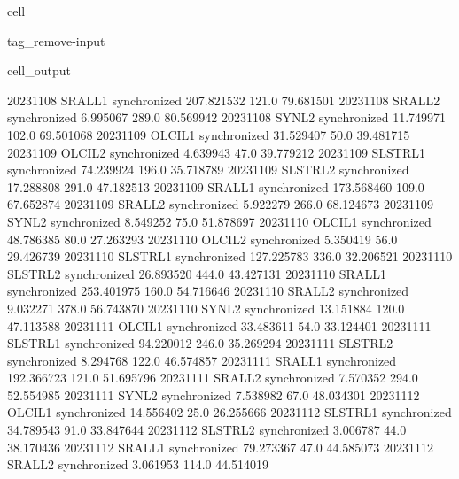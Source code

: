 \documentclass[letterpaper,10pt,english]{jupyterBook}
\begin{document}
\begin{sphinxuseclass}{cell}
\begin{sphinxuseclass}{tag_remove-input}
\begin{sphinxVerbatimOutput}
\begin{sphinxuseclass}{cell_output}
\begin{sphinxVerbatim}[commandchars=\\\{\}]
2023\PYGZhy{}11\PYGZhy{}08      SRAL\PYGZus{}L1  synchronized  207.821532   121.0   79.681501
2023\PYGZhy{}11\PYGZhy{}08      SRAL\PYGZus{}L2  synchronized    6.995067   289.0   80.569942
2023\PYGZhy{}11\PYGZhy{}08       SYN\PYGZus{}L2  synchronized   11.749971   102.0   69.501068
2023\PYGZhy{}11\PYGZhy{}09      OLCI\PYGZus{}L1  synchronized   31.529407    50.0   39.481715
2023\PYGZhy{}11\PYGZhy{}09      OLCI\PYGZus{}L2  synchronized    4.639943    47.0   39.779212
2023\PYGZhy{}11\PYGZhy{}09     SLSTR\PYGZus{}L1  synchronized   74.239924   196.0   35.718789
2023\PYGZhy{}11\PYGZhy{}09     SLSTR\PYGZus{}L2  synchronized   17.288808   291.0   47.182513
2023\PYGZhy{}11\PYGZhy{}09      SRAL\PYGZus{}L1  synchronized  173.568460   109.0   67.652874
2023\PYGZhy{}11\PYGZhy{}09      SRAL\PYGZus{}L2  synchronized    5.922279   266.0   68.124673
2023\PYGZhy{}11\PYGZhy{}09       SYN\PYGZus{}L2  synchronized    8.549252    75.0   51.878697
2023\PYGZhy{}11\PYGZhy{}10      OLCI\PYGZus{}L1  synchronized   48.786385    80.0   27.263293
2023\PYGZhy{}11\PYGZhy{}10      OLCI\PYGZus{}L2  synchronized    5.350419    56.0   29.426739
2023\PYGZhy{}11\PYGZhy{}10     SLSTR\PYGZus{}L1  synchronized  127.225783   336.0   32.206521
2023\PYGZhy{}11\PYGZhy{}10     SLSTR\PYGZus{}L2  synchronized   26.893520   444.0   43.427131
2023\PYGZhy{}11\PYGZhy{}10      SRAL\PYGZus{}L1  synchronized  253.401975   160.0   54.716646
2023\PYGZhy{}11\PYGZhy{}10      SRAL\PYGZus{}L2  synchronized    9.032271   378.0   56.743870
2023\PYGZhy{}11\PYGZhy{}10       SYN\PYGZus{}L2  synchronized   13.151884   120.0   47.113588
2023\PYGZhy{}11\PYGZhy{}11      OLCI\PYGZus{}L1  synchronized   33.483611    54.0   33.124401
2023\PYGZhy{}11\PYGZhy{}11     SLSTR\PYGZus{}L1  synchronized   94.220012   246.0   35.269294
2023\PYGZhy{}11\PYGZhy{}11     SLSTR\PYGZus{}L2  synchronized    8.294768   122.0   46.574857
2023\PYGZhy{}11\PYGZhy{}11      SRAL\PYGZus{}L1  synchronized  192.366723   121.0   51.695796
2023\PYGZhy{}11\PYGZhy{}11      SRAL\PYGZus{}L2  synchronized    7.570352   294.0   52.554985
2023\PYGZhy{}11\PYGZhy{}11       SYN\PYGZus{}L2  synchronized    7.538982    67.0   48.034301
2023\PYGZhy{}11\PYGZhy{}12      OLCI\PYGZus{}L1  synchronized   14.556402    25.0   26.255666
2023\PYGZhy{}11\PYGZhy{}12     SLSTR\PYGZus{}L1  synchronized   34.789543    91.0   33.847644
2023\PYGZhy{}11\PYGZhy{}12     SLSTR\PYGZus{}L2  synchronized    3.006787    44.0   38.170436
2023\PYGZhy{}11\PYGZhy{}12      SRAL\PYGZus{}L1  synchronized   79.273367    47.0   44.585073
2023\PYGZhy{}11\PYGZhy{}12      SRAL\PYGZus{}L2  synchronized    3.061953   114.0   44.514019

\end{sphinxVerbatim}
\end{sphinxuseclass}
\end{sphinxVerbatimOutput}
\end{sphinxuseclass}
\end{sphinxuseclass}
\end{document}
